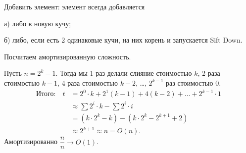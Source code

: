 \documentclass[a4paper,11pt]{article}
\begin{document}
\newpage

Добавить элемент: элемент всегда добавляется

а) либо в новую кучу; %

б) либо, если есть 2 одинаковые кучи, на них корень и запускается Sift Down. %

Посчитаем амортизированную сложность.

Пусть $n=2^k-1$.
Тогда мы 1 раз делали слияние стоимостью $k$, 2 раза стоимостью $k-1$,
4 раза стоимостью $k-2$, \dots, $2^{k-1}$ раз стоимостью 0.
\[
	\begin{aligned}
		\text{Итого:}\quad t
		 & =2^0\cdot k+2^1(k-1)+4(k-2)+\dots+2^{k-1}\cdot 1 \\
		 & \approx\sum 2^i\cdot k-\sum 2^i\cdot i           \\
		 & =(k\cdot 2^k-k)-(k\cdot 2^k-2^{k+1}+2)           \\
		 & \approx 2^{k+1}\approx n=O(n).
	\end{aligned}
\]
Амортизированно $\dfrac{n}{n}\to O(1)$.

\newpage
\end{document}
